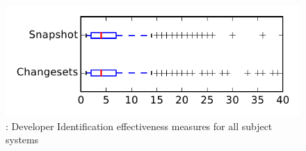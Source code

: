 
\begin{figure}
\centering
\includegraphics[height=0.4\textheight]{figures/dit/rq1_tiny}
\caption{\done: Developer Identification effectiveness measures for all subject systems}
\label{fig:dit:rq1:tiny}
\end{figure}
